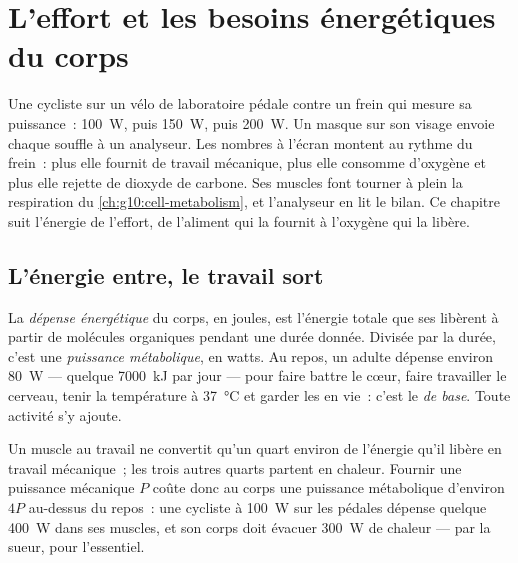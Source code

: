 \chapter{L'effort et les besoins énergétiques du corps}\label{ch:g10:exercise-and-energy}

Une cycliste sur un vélo de laboratoire pédale contre un frein qui
mesure sa puissance~: \qty{100}{W}, puis \qty{150}{W}, puis
\qty{200}{W}. Un masque sur son visage envoie chaque souffle à un
analyseur. Les nombres à l'écran montent au rythme du frein~: plus elle
fournit de travail mécanique, plus elle consomme d'oxygène et plus elle
rejette de dioxyde de carbone. Ses muscles font tourner à plein la
respiration du \cref{ch:g10:cell-metabolism}, et l'analyseur en lit le
bilan. Ce chapitre suit l'énergie de l'effort, de l'aliment qui la
fournit à l'oxygène qui la libère.

\section{L'énergie entre, le travail sort}

\begin{definition}\label{def:g10:exercise-and-energy:expenditure}
La \emph{dépense énergétique} du corps, en
joules, est l'énergie totale que ses  libèrent à partir de
molécules organiques pendant une durée donnée. Divisée par la durée,
c'est une \emph{puissance métabolique}, en watts. Au repos, un adulte
dépense environ \qty{80}{W} --- quelque \qty{7000}{kJ} par jour ---
pour faire battre le cœur, faire travailler le cerveau, tenir la
température à \qty{37}{\celsius} et garder les  en vie~: c'est
le \emph{ de base}. Toute activité s'y ajoute.
\end{definition}

\begin{proposition}[Où va l'énergie]\label{prop:g10:exercise-and-energy:efficiency}
Un muscle au travail ne convertit qu'un quart environ de l'énergie
qu'il libère en travail mécanique~; les trois autres quarts partent en
chaleur. Fournir une puissance mécanique $P$ coûte donc au corps une
puissance métabolique d'environ $4P$ au-dessus du repos~: une cycliste
à \qty{100}{W} sur les pédales dépense quelque \qty{400}{W} dans ses
muscles, et son corps doit évacuer \qty{300}{W} de chaleur --- par la
sueur, pour l'essentiel.
\end{proposition}
\admitted

